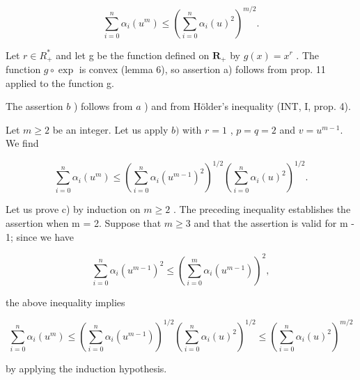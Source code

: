 \[
\sum_ {i = 0} ^ {n} \alpha_ {i} (u ^ {m}) \leqslant \left(\sum_ {i = 0} ^ {n} \alpha_ {i} (u) ^ {2}\right) ^ {m / 2}.
\]

Let \(r \in R_{+}^{*}\) and let g be the function defined on \(\mathbf{R}_{+}\) by \(g(x) = x^{r}\) . The function \(g \circ \exp\) is convex (lemma 6), so assertion a) follows from prop. 11 applied to the function g.

The assertion \(b\) ) follows from \(a\) ) and from Hölder's inequality (INT, I, prop. 4).

Let \(m \geqslant 2\) be an integer. Let us apply \(b)\) with \(r = 1\) , \(p = q = 2\) and \(v = u^{m-1}\). We find

\[
\sum_ {i = 0} ^ {n} \alpha_ {i} (u ^ {m}) \leqslant \left(\sum_ {i = 0} ^ {n} \alpha_ {i} (u ^ {m - 1}) ^ {2}\right) ^ {1 / 2} \left(\sum_ {i = 0} ^ {n} \alpha_ {i} (u) ^ {2}\right) ^ {1 / 2}.
\]

Let us prove c) by induction on \(m \geqslant 2\) . The preceding inequality establishes the assertion when m = 2. Suppose that \(m \geqslant 3\) and that the assertion is valid for m - 1; since we have

\[
\sum_ {i = 0} ^ {n} \alpha_ {i} (u ^ {m - 1}) ^ {2} \leqslant \left(\sum_ {i = 0} ^ {m} \alpha_ {i} (u ^ {m - 1})\right) ^ {2},
\]

the above inequality implies

\[
\sum_ {i = 0} ^ {n} \alpha_ {i} (u ^ {m}) \leqslant \left(\sum_ {i = 0} ^ {n} \alpha_ {i} (u ^ {m - 1})\right) ^ {1 / 2} \left(\sum_ {i = 0} ^ {n} \alpha_ {i} (u) ^ {2}\right) ^ {1 / 2} \leqslant \left(\sum_ {i = 0} ^ {n} \alpha_ {i} (u) ^ {2}\right) ^ {m / 2}
\]

by applying the induction hypothesis.

